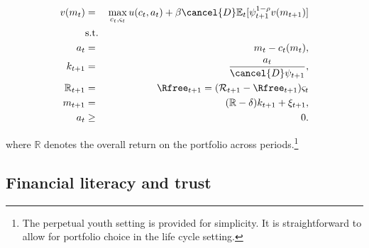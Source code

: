 \documentclass[\econtexRoot/Chp1proposal]{subfiles}
\begin{document}
\begin{eqnarray*}
  v(m_t) &=& \max_{c_t, \varsigma_t} u(c_t, a_t) + \beta \cancel{D} \mathbb{E}_{t}[\psi_{t+1}^{1-\rho}v(m_{t+1})] \\
  &\text{s.t.}& \\
  a_t &=& m_t - c_t(m_t), \\
  k_{t+1} &=& \frac{a_t}{\cancel{D}\psi_{t+1}}, \\
  \mathbb{R}_{t+1} &=& \Rfree_{t+1} = (\mathcal{R}_{t+1} - \Rfree_{t+1})\varsigma_t \\
  m_{t+1} &=& (\mathbb{R} - \delta)k_{t+1} + \xi_{t+1}, \\
  a_t &\geq& 0.
\end{eqnarray*}

\par where $\mathbb{R}$ denotes the overall return on the portfolio across periods.\footnote{The perpetual youth setting is provided for simplicity. It is straightforward to allow for portfolio choice in the life cycle setting.}




\subsection{Financial literacy and trust}
\end{document}
